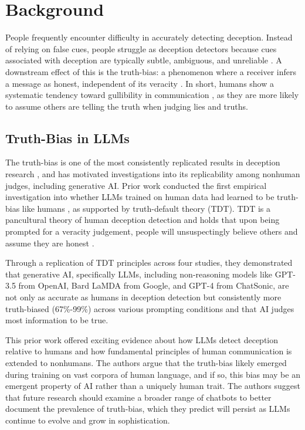 \documentclass{article}
\begin{document}
\section{Background} %

People frequently encounter difficulty in accurately detecting deception. Instead of relying on false cues, people struggle as deception detectors because cues associated with deception are typically subtle, ambiguous, and unreliable \citep{depaulo_cues_2003, hartwig_why_2011}. A downstream effect of this is the truth-bias: a phenomenon where a receiver infers a message as honest, independent of its veracity \citep{levine_truth-default_2014, mccornack_deception_1986}. In short, humans show a systematic tendency toward gullibility in communication \citep{levine_duped_2020}, as they are more likely to assume others are telling the truth when judging lies and truths.

\subsection{Truth-Bias in LLMs}

The truth-bias is one of the most consistently replicated results in deception research \citep{levine_duped_2020}, and has motivated investigations into its replicability among nonhuman judges, including generative AI. Prior work conducted the first empirical investigation into whether LLMs trained on human data had learned to be truth-bias like humans \citep{markowitz_generative_2024}, as supported by truth-default theory (TDT). TDT is a pancultural theory of human deception detection and holds that upon being prompted for a veracity judgement, people will unsuspectingly believe others and assume they are honest \citep{levine_duped_2020, levine_truth-default_2014}. %

Through a replication of TDT principles across four studies, they demonstrated that generative AI, specifically LLMs, including non-reasoning models like GPT-3.5 from OpenAI, Bard LaMDA from Google, and GPT-4 from ChatSonic, are not only as accurate as humans in deception detection but consistently more truth-biased (67\%-99\%) across various prompting conditions and that AI judges most information to be true.

This prior work offered exciting evidence about how LLMs detect deception relative to humans and how fundamental principles of human communication is extended to nonhumans. The authors argue that the truth-bias likely emerged during training on vast corpora of human language, and if so, this bias may be an emergent property of AI rather than a uniquely human trait. The authors suggest that future research should examine a broader range of chatbots to better document the prevalence of truth-bias, which they predict will persist as LLMs continue to evolve and grow in sophistication.
\end{document}
